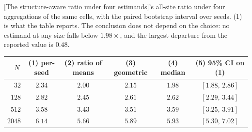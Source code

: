 
\begin{center}
\begin{minipage}{\linewidth}\small\centering
{}[The structure-aware ratio under four estimands]{\structuredtable{}'s all-site ratio under four
aggregations of the same cells, with the paired bootstrap interval over seeds.
(1) is what the table reports. The conclusion does not depend on the choice: no
estimand at any size falls below $1.98\times$, and the largest
departure from the reported value is $0.48$.}
\label{tab:aggregation-structured}
\setlength{\tabcolsep}{4pt}
\begin{tabular}{rccccc}
\toprule
$N$ & (1) per-seed & (2) ratio of means & (3) geometric & (4) median & (5) 95\% CI on (1) \\
\midrule
$32$ & $2.34$ & $2.00$ & $2.15$ & $1.98$ & $[1.88,\, 2.86]$ \\
$128$ & $2.82$ & $2.45$ & $2.61$ & $2.62$ & $[2.29,\, 3.44]$ \\
$512$ & $3.58$ & $3.43$ & $3.51$ & $3.59$ & $[3.25,\, 3.91]$ \\
$2048$ & $6.14$ & $5.66$ & $5.89$ & $5.93$ & $[5.30,\, 7.02]$ \\
\bottomrule
\end{tabular}
\end{minipage}
\end{center}
